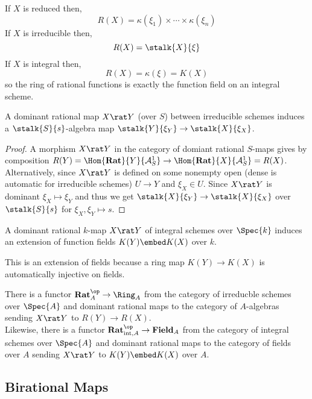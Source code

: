 \documentclass[12pt]{article}
\begin{document}
\begin{cor}
If $X$ is reduced then,
\[ R(X) = \kappa(\xi_1) \times \cdots \times \kappa(\xi_n) \] 
If $X$ is irreducible then,
\[ R(X) = \stalk{X}{\xi} \]
If $X$ is integral then,
\[ R(X) = \kappa(\xi) = K(X) \]
so the ring of rational functions is exactly the function field on an integral scheme.
\end{cor}

\begin{lemma}
A dominant rational map $X \rat Y$ (over $S$) between irreducible schemes induces a $\stalk{S}{s}$-algebra map $\stalk{Y}{\xi_Y} \to \stalk{X}{\xi_X}$. 
\end{lemma}

\begin{proof}
A morphism $X \rat Y$ in the category of domiant rational $S$-maps gives by composition $R(Y) = \Hom{\mathbf{Rat}}{Y}{\A^1_S} \to \Hom{\mathbf{Rat}}{X}{\A^1_S} = R(X)$. Alternatively, since $X \rat Y$ is defined on some nonempty open (dense is automatic for irreducible schemes) $U \to Y$ and $\xi_X \in U$. Since $X \rat Y$ is dominant $\xi_X \mapsto \xi_Y$ and thus we get $\stalk{X}{\xi_Y} \to \stalk{X}{\xi_X}$ over $\stalk{S}{s}$ for $\xi_X, \xi_Y \mapsto s$. 
\end{proof}

\begin{cor}
A dominant rational $k$-map $X \rat Y$ of integral schemes over $\Spec{k}$ induces an extension of function fields $K(Y) \embed K(X)$ over $k$.
\end{cor}

\begin{rmk}
This is an extension of fields because a ring map $K(Y) \to K(X)$ is automatically injective on fields. 
\end{rmk}

\begin{cor}
There is a functor $\mathbf{Rat}_A^\op \to \Ring_A$ from the category of irreducble schemes over $\Spec{A}$ and dominant rational maps to the category of $A$-algebras sending $X \rat Y$ to $R(Y) \to R(X)$. 
\bigskip\\
Likewise, there is a functor $\mathbf{Rat}_{\text{int}, A}^\op \to \mathbf{Field}_A$ from the category of integral schemes over $\Spec{A}$ and dominant rational maps to the category of fields over $A$ sending $X \rat Y$ to $K(Y) \embed K(X)$ over $A$. 
\end{cor}

\subsection{Birational Maps}
\end{document}
